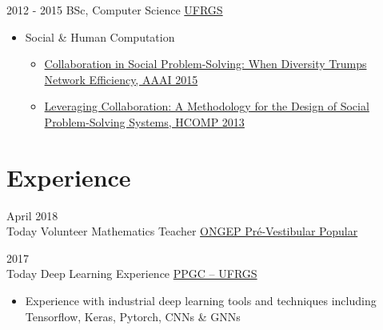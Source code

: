 \documentclass[letterpaper]{twentysecondcv} %
\begin{document}
\begin{twenty}
{{\begin{itemize}
\begin{itemize}
            \end{itemize}
        \end{itemize}
        }
        }
    \twentyitem
    	{2012 - 2015}
        {BSc, Computer Science}
        {\href{http://www.ufrgs.br}{UFRGS}}
        {}
        {
        {
        \begin{itemize}
            \item Social \& Human Computation
            \begin{itemize}
                \item {\small \color{pblue} \href{http://www.aaai.org/ocs/index.php/AAAI/AAAI15/paper/view/9844}{Collaboration in Social Problem-Solving: When Diversity Trumps Network Efficiency, AAAI 2015}}
                \item {\small \color{pblue} \href{http://www.aaai.org/ocs/index.php/HCOMP/HCOMP13/paper/view/7481}{Leveraging Collaboration: A Methodology for the Design of Social Problem-Solving Systems, HCOMP 2013}}
            \end{itemize}
        \end{itemize}
        }
        }
\end{twenty}


\vspace{-2em}
\section{Experience}

\begin{twenty} %
	\twentyitem
    	{April 2018 \\ Today}
        {Volunteer Mathematics Teacher}
        {\href{http://www.ongep.org/}{ONGEP Pré-Vestibular Popular}}
        {}
        {}
        
    \twentyitem
    	{2017 \\ Today}
        {Deep Learning Experience}
        {\href{http://www.inf.ufrgs.br/ppgc/en}{PPGC -- UFRGS}}
        {}
        {
        {\begin{itemize}
            \item Experience with industrial deep learning tools and techniques including Tensorflow, Keras, Pytorch, CNNs \& GNNs
        \end{itemize}}
        }
        
\end{twenty}
\end{document}

